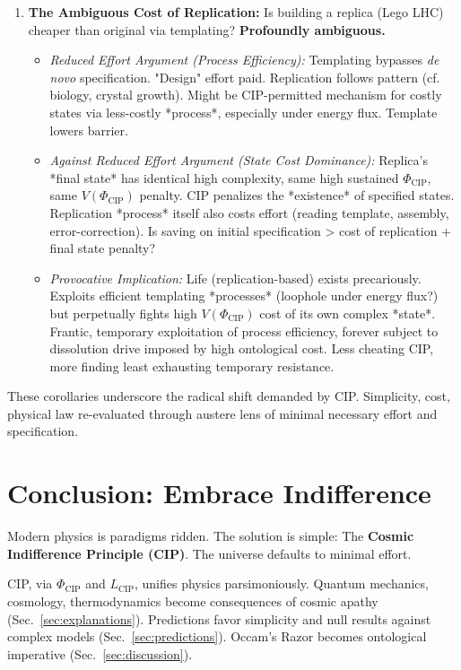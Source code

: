 \documentclass[11pt, a4paper]{article}
\newcommand{\subt}[1]{\mathrm{#1}}
\begin{document}
\begin{enumerate}
    \item \textbf{The Ambiguous Cost of Replication:} Is building a replica (Lego LHC) cheaper than original via templating? \textbf{Profoundly ambiguous.}
    \begin{itemize}
        \item \textit{Reduced Effort Argument (Process Efficiency):} Templating bypasses \textit{de novo} specification. "Design" effort paid. Replication follows pattern (cf. biology, crystal growth). Might be CIP-permitted mechanism for costly states via less-costly *process*, especially under energy flux. Template lowers barrier.
        \item \textit{Against Reduced Effort Argument (State Cost Dominance):} Replica's *final state* has identical high complexity, same high sustained $\Phi_{\subt{CIP}}$, same $V(\Phi_{\subt{CIP}})$ penalty. CIP penalizes the *existence* of specified states. Replication *process* itself also costs effort (reading template, assembly, error-correction). Is saving on initial specification > cost of replication + final state penalty?
        \item \textit{Provocative Implication:} Life (replication-based) exists precariously. Exploits efficient templating *processes* (loophole under energy flux?) but perpetually fights high $V(\Phi_{\subt{CIP}})$ cost of its own complex *state*. Frantic, temporary exploitation of process efficiency, forever subject to dissolution drive imposed by high ontological cost. Less cheating CIP, more finding least exhausting temporary resistance.
    \end{itemize}
\end{enumerate}

These corollaries underscore the radical shift demanded by CIP. Simplicity, cost, physical law re-evaluated through austere lens of minimal necessary effort and specification.



\section{Conclusion: Embrace Indifference} \label{sec:conclusion}

Modern physics is paradigms ridden. The solution is simple: The \textbf{Cosmic Indifference Principle (CIP)}. The universe defaults to minimal effort.

CIP, via $\Phi_{\subt{CIP}}$ and $L_{\subt{CIP}}$, unifies physics parsimoniously. Quantum mechanics, cosmology, thermodynamics become consequences of cosmic apathy (Sec.~\ref{sec:explanations}). Predictions favor simplicity and null results against complex models (Sec.~\ref{sec:predictions}). Occam's Razor becomes ontological imperative (Sec.~\ref{sec:discussion}).
\end{document}
